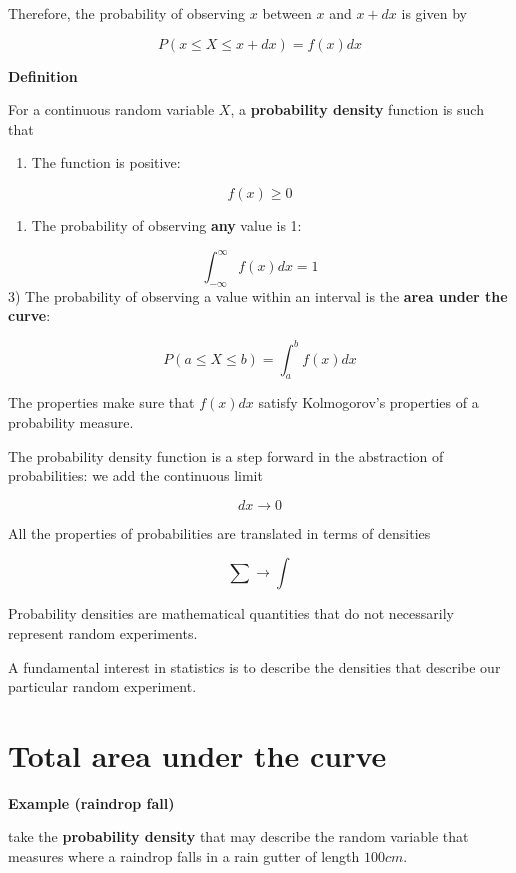 \documentclass[
]{book}
\providecommand{\tightlist}{%
  \setlength{\itemsep}{0pt}\setlength{\parskip}{0pt}}
\begin{document}
Therefore, the probability of observing \(x\) between \(x\) and \(x+dx\)
is given by

\[P(x\leq X \leq x+dx)= f(x) dx\]

\textbf{Definition}

For a continuous random variable \(X\), a \textbf{probability density} function is such that

\begin{enumerate}
\def\labelenumi{\arabic{enumi})}
\tightlist
\item
  The function is positive:
\end{enumerate}

\[f(x) \geq 0\]

\begin{enumerate}
\def\labelenumi{\arabic{enumi})}
\setcounter{enumi}{1}
\tightlist
\item
  The probability of observing \textbf{any} value is 1:
\end{enumerate}

\[\int_{-\infty}^{\infty} f(x) dx = 1\]
3) The probability of observing a value within an interval is the \textbf{area under the curve}:

\[P(a\leq X \leq b)=\int_{a}^{b} f(x) dx\]

The properties make sure that \(f(x)dx\) satisfy Kolmogorov's properties of a probability measure.

The probability density function is a step forward in the abstraction of probabilities: we add the continuous limit

\[dx \rightarrow 0\]

All the properties of probabilities are translated in terms of densities

\[\sum \rightarrow \int\]

Probability densities are mathematical quantities that do not necessarily represent random experiments.

A fundamental interest in statistics is to describe the densities that describe our particular random experiment.

\hypertarget{total-area-under-the-curve}{%
\section{Total area under the curve}\label{total-area-under-the-curve}}

\textbf{Example (raindrop fall)}

take the \textbf{probability density} that may describe the random variable that measures where a raindrop falls in a rain gutter of length \(100cm\).
\end{document}
